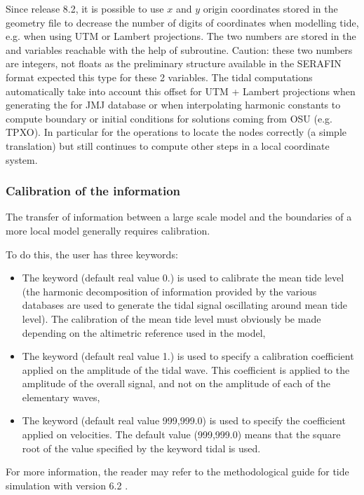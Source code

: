 Since release 8.2, it is possible to use $x$ and $y$ origin coordinates stored
in the geometry file to decrease the number of digits of coordinates
when modelling tide, e.g. when using UTM or Lambert projections.
The two numbers are stored in the  and 
variables reachable with the help of  subroutine.
Caution: these two numbers are integers, not floats as the preliminary structure
available in the SERAFIN format expected this type for these 2 variables.
The tidal computations automatically take into account this offset for
UTM + Lambert projections when generating the 
for JMJ database or when interpolating harmonic constants to compute boundary
or initial conditions for solutions coming from OSU (e.g. TPXO).
In particular for the operations to locate the nodes correctly (a simple
translation) but  still continues to compute other steps in a local
coordinate system.

\subsubsection{Calibration of the information}

The transfer of information between a large scale model and the boundaries of
a more local model generally requires calibration.

To do this, the user has three keywords:

\begin{itemize}
\item The keyword  (default real
value 0.) is used to calibrate the mean tide level (the harmonic decomposition
of information provided by the various databases are used to generate the tidal
signal oscillating around mean tide level). The calibration of the mean tide
level must obviously be made depending on the altimetric reference used in the
model,

\item The keyword  (default real
value 1.) is used to specify a calibration coefficient applied on the
amplitude of the tidal wave. This coefficient is applied to the amplitude of
the overall signal, and not on the amplitude of each of the elementary waves,

\item The keyword  (default
real value 999,999.0) is used to specify the coefficient applied on velocities.
The default value (999,999.0) means that the square root of the value
specified by the keyword  tidal is
used.
\end{itemize}

For more information, the reader may refer to the methodological guide for tide
simulation with version 6.2 \cite{Pham2012}.
